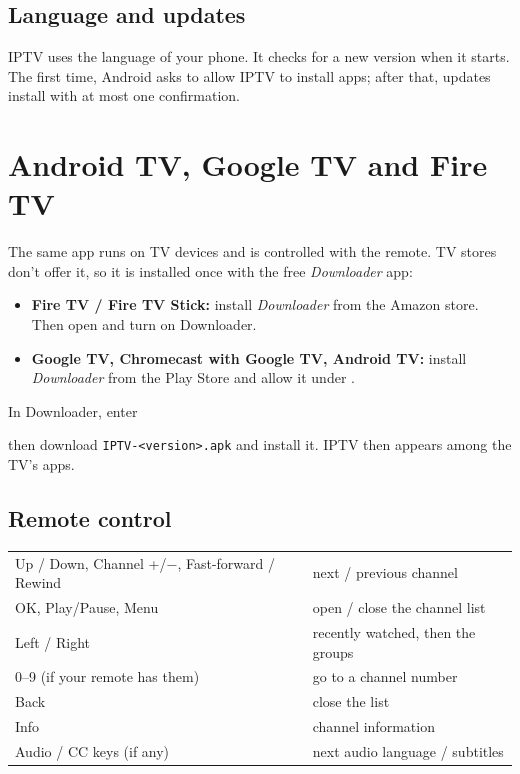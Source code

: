 \subsection{Language and updates}
IPTV uses the language of your phone. It checks for a new version when it
starts. The first time, Android asks to allow IPTV to install apps; after
that, updates install with at most one confirmation.

\section{Android TV, Google TV and Fire TV}

The same app runs on TV devices and is controlled with the remote. TV stores
don't offer it, so it is installed once with the free \emph{Downloader} app:

\begin{itemize}
  \item \textbf{Fire TV / Fire TV Stick:} install \emph{Downloader} from the
        Amazon store. Then open  and turn on Downloader.
  \item \textbf{Google TV, Chromecast with Google TV, Android TV:} install
        \emph{Downloader} from the Play Store and allow it under
        .
\end{itemize}
In Downloader, enter
\begin{center}
  \download
\end{center}
then download \texttt{IPTV-\textless version\textgreater.apk} and install it.
IPTV then appears among the TV's apps.

\subsection{Remote control}
\begin{xltabular}{\linewidth}{@{}KX@{}}
Up / Down, Channel +/$-$, Fast-forward / Rewind & next / previous channel \\
OK, Play/Pause, Menu & open / close the channel list \\
Left / Right & recently watched, then the groups \\
0--9 (if your remote has them) & go to a channel number \\
Back & close the list \\
Info & channel information \\
Audio / CC keys (if any) & next audio language / subtitles \\
\bottomrule
\end{xltabular}

